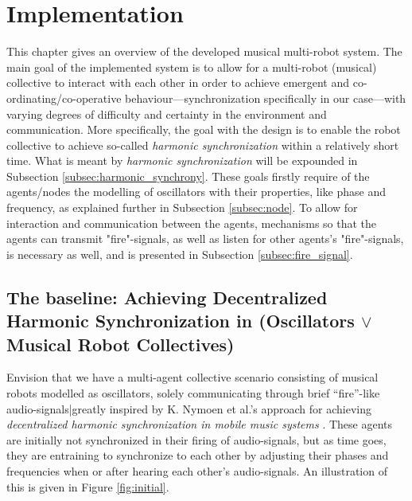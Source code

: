 \chapter{Implementation}


This chapter gives an overview of the developed musical multi-robot system. The main goal of the implemented system is to allow for a multi-robot (musical) collective to interact with each other in order to achieve emergent and co-ordinating/co-operative behaviour—synchronization specifically in our case—with varying degrees of difficulty and certainty in the environment and communication. More specifically, the goal with the design is to enable the robot collective to achieve so-called \textit{harmonic synchronization} within a relatively short time. What is meant by \textit{harmonic synchronization} will be expounded in Subsection \ref{subsec:harmonic_synchrony}. These goals firstly require of the agents/nodes the modelling of oscillators with their properties, like phase and frequency, as explained further in Subsection \ref{subsec:node}. To allow for interaction and communication between the agents, mechanisms so that the agents can transmit "fire"-signals, as well as listen for other agents's "fire"-signals, is necessary as well, and is presented in Subsection \ref{subsec:fire_signal}.



\section{The baseline: Achieving Decentralized Harmonic Synchronization in (Oscillators $\vee$ Musical Robot Collectives)}
\label{sec:baseline}
	Envision that we have a multi-agent collective scenario consisting of musical robots modelled as oscillators, solely communicating through brief ``fire''-like audio-signals|greatly inspired by K. Nymoen et al.'s approach for achieving \textit{decentralized harmonic synchronization in mobile music systems} \cite{nymoen_synch}. These agents are initially not synchronized in their firing of audio-signals, but as time goes, they are entraining to synchronize to each other by adjusting their phases and frequencies when or after hearing each other's audio-signals. An illustration of this is given in Figure \ref{fig:initial}.

